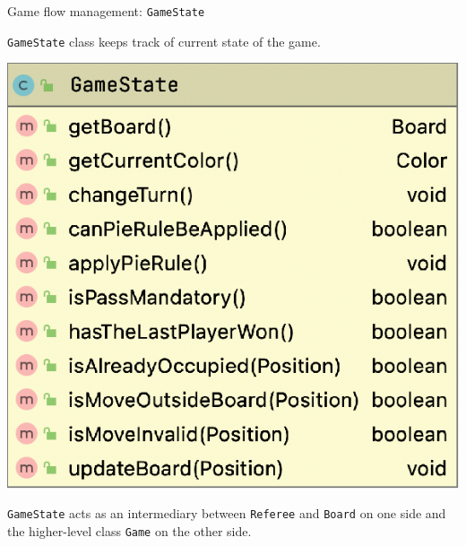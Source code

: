 \documentclass{beamer}
\begin{document}
\begin{frame}{Game flow management: \texttt{GameState}}
     
     \texttt{GameState} class keeps track of current state of the game.
     \vspace{0.5cm}
     \begin{center}
      \includegraphics[scale=0.42]{images/gamestate.png}
     \end{center}
    
     \vspace{0.4cm}
   \texttt{GameState} acts as an intermediary between \texttt{Referee} and \texttt{Board} on one side and the higher-level class \texttt{Game} on the other  side.
     
\end{frame}
\end{document}
